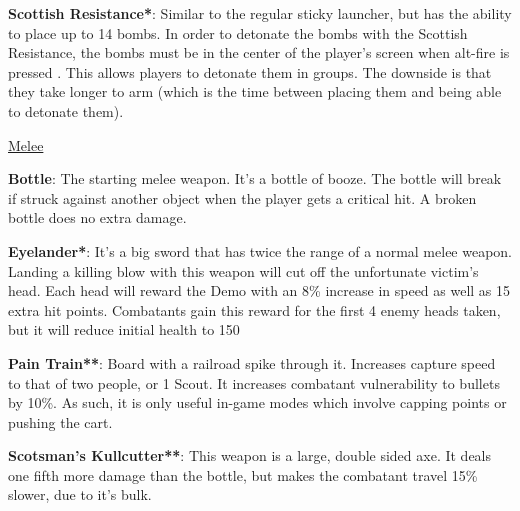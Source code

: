 {\bf Scottish Resistance*}: Similar to the regular sticky launcher, but has the ability to place up to 14 bombs. In order to detonate the bombs with the Scottish Resistance, the bombs must be in the center of the player's screen when alt-fire is pressed . This allows players to detonate them in groups. The downside is that they take longer to arm (which is the time between placing them and being able to detonate them).

\newpage

\begin {center}
\underline {Melee}
\end {center}

{\bf Bottle}: The starting melee weapon. It's a bottle of booze. The bottle will break if struck against another object when the player gets a critical hit. A broken bottle does no extra damage.

{\bf Eyelander*}: It's a big sword that has twice the range of a normal melee weapon. Landing a killing blow with this weapon will cut off the unfortunate victim's head. Each head will reward the Demo with an 8\% increase in speed as well as 15 extra hit points. Combatants gain this reward for the first 4 enemy heads taken, but it will reduce initial health to 150

{\bf Pain Train**}: Board with a railroad spike through it. Increases capture speed to that of two people, or 1 Scout. It increases combatant vulnerability to bullets by 10\%. As such, it is only useful in-game modes which involve capping points or pushing the cart.

{\bf Scotsman's Kullcutter**}: This weapon is a large, double sided axe.  It deals one fifth more damage than the bottle, but makes the combatant travel 15\% slower, due to it's bulk.


